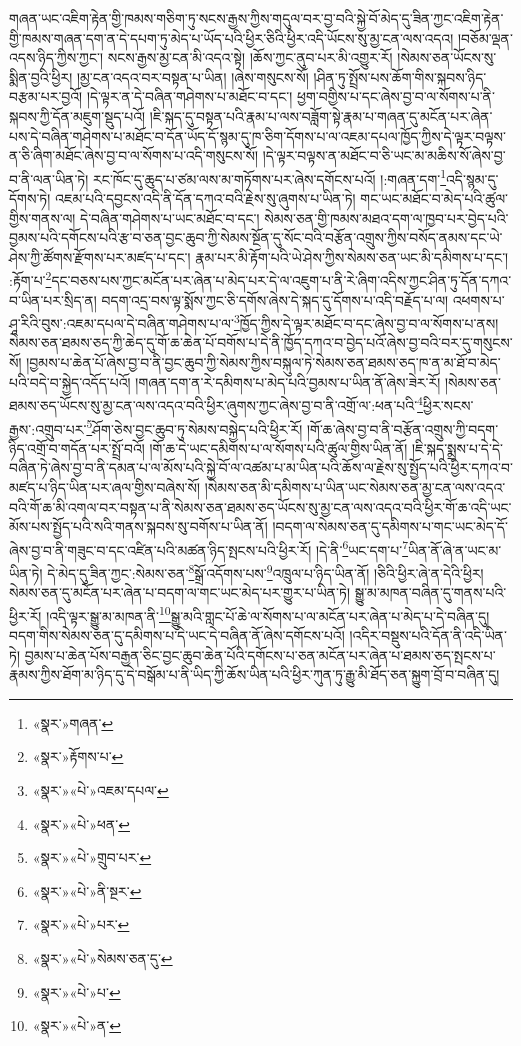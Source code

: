 གཞན་ཡང་འཇིག་རྟེན་གྱི་ཁམས་གཅིག་ཏུ་སངས་རྒྱས་ཀྱིས་གདུལ་བར་བྱ་བའི་སྐྱེ་བོ་མེད་དུ་ཟིན་ཀྱང་འཇིག་རྟེན་གྱི་ཁམས་གཞན་དག་ན་དེ་དཔག་ཏུ་མེད་པ་ཡོད་པའི་ཕྱིར་ཅིའི་ཕྱིར་འདི་ཡོངས་སུ་མྱ་ངན་ལས་འདའ། །བཅོམ་ལྡན་འདས་ཉིད་ཀྱིས་ཀྱང་། སངས་རྒྱས་མྱ་ངན་མི་འདའ་སྟེ། །ཆོས་ཀྱང་ནུབ་པར་མི་འགྱུར་རོ། །སེམས་ཅན་ཡོངས་སུ་སྨིན་བྱའི་ཕྱིར། །མྱ་ངན་འདའ་བར་བསྟན་པ་ཡིན། །ཞེས་གསུངས་སོ། །ཤིན་ཏུ་སྤྲོས་པས་ཆོག་གིས་སྐབས་ཉིད་བརྩམ་པར་བྱའོ། །དེ་ལྟར་ན་དེ་བཞིན་གཤེགས་པ་མཐོང་བ་དང་། ཕྱག་བགྱིས་པ་དང་ཞེས་བྱ་བ་ལ་སོགས་པ་ནི་སྐབས་ཀྱི་དོན་མཇུག་སྡུད་པའོ། །ཇི་སྐད་དུ་བསྟན་པའི་རྣམ་པ་ལས་བཟློག་སྟེ་རྣམ་པ་གཞན་དུ་མངོན་པར་ཞེན་པས་དེ་བཞིན་གཤེགས་པ་མཐོང་བ་དོན་ཡོད་དོ་སྙམ་དུ་ཁ་ཅིག་དོགས་པ་ལ་འཇམ་དཔལ་ཁྱོད་ཀྱིས་དེ་ལྟར་བལྟས་ན་ཅི་ཞིག་མཐོང་ཞེས་བྱ་བ་ལ་སོགས་པ་འདི་གསུངས་སོ། །དེ་ལྟར་བལྟས་ན་མཐོང་བ་ཅི་ཡང་མ་མཆིས་སོ་ཞེས་བྱ་བ་ནི་ལན་ཡིན་ཏེ། རང་ཁོང་དུ་ཆུད་པ་ཙམ་ལས་མ་གཏོགས་པར་ཞེས་དགོངས་པའོ། །:གཞན་དག་\footnote{«སྣར་»གཞན་}འདི་སྙམ་དུ་དོགས་ཏེ། འཇམ་པའི་དབྱངས་འདི་ནི་དོན་དཀའ་བའི་རྗེས་སུ་ཞུགས་པ་ཡིན་ཏེ། གང་ཡང་མཐོང་བ་མེད་པའི་ཚུལ་གྱིས་གནས་ལ། དེ་བཞིན་གཤེགས་པ་ཡང་མཐོང་བ་དང་། སེམས་ཅན་གྱི་ཁམས་མཐའ་དག་ལ་ཁྱབ་པར་བྱེད་པའི་བྱམས་པའི་དགོངས་པའི་རྩ་བ་ཅན་བྱང་ཆུབ་ཀྱི་སེམས་སྔོན་དུ་སོང་བའི་བརྩོན་འགྲུས་ཀྱིས་བསོད་ནམས་དང་ཡེ་ཤེས་ཀྱི་ཚོགས་རྫོགས་པར་མཛད་པ་དང་། རྣམ་པར་མི་རྟོག་པའི་ཡེ་ཤེས་ཀྱིས་སེམས་ཅན་ཡང་མི་དམིགས་པ་དང་། :རྟོག་པ་\footnote{«སྣར་»རྟོགས་པ་}དང་བཅས་པས་ཀྱང་མངོན་པར་ཞེན་པ་མེད་པར་དེ་ལ་འཇུག་པ་ནི་རེ་ཞིག་འདིས་ཀྱང་ཤིན་ཏུ་དོན་དཀའ་བ་ཡིན་པར་སྲིད་ན། བདག་འདྲ་བས་ལྟ་སྨོས་ཀྱང་ཅི་དགོས་ཞེས་དེ་སྐད་དུ་དོགས་པ་འདི་བརྗོད་པ་ལ། འཕགས་པ་ཤཱ་རིའི་བུས་:འཇམ་དཔལ་དེ་བཞིན་གཤེགས་པ་ལ་\footnote{«སྣར་»«པེ་»འཇམ་དཔལ་}ཁྱོད་ཀྱིས་དེ་ལྟར་མཐོང་བ་དང་ཞེས་བྱ་བ་ལ་སོགས་པ་ནས། སེམས་ཅན་ཐམས་ཅད་ཀྱི་ཆེད་དུ་གོ་ཆ་ཆེན་པོ་བགོས་པ་དེ་ནི་ཁྱོད་དཀའ་བ་བྱེད་པའོ་ཞེས་བྱ་བའི་བར་དུ་གསུངས་སོ། །བྱམས་པ་ཆེན་པོ་ཞེས་བྱ་བ་ནི་བྱང་ཆུབ་ཀྱི་སེམས་ཀྱིས་བསྐུལ་ཏེ་སེམས་ཅན་ཐམས་ཅད་ཁ་ན་མ་ཐོ་བ་མེད་པའི་བདེ་བ་སྐྱེད་འདོད་པའོ། །གཞན་དག་ན་རེ་དམིགས་པ་མེད་པའི་བྱམས་པ་ཡིན་ནོ་ཞེས་ཟེར་རོ། །སེམས་ཅན་ཐམས་ཅད་ཡོངས་སུ་མྱ་ངན་ལས་འདའ་བའི་ཕྱིར་ཞུགས་ཀྱང་ཞེས་བྱ་བ་ནི་འགྲོ་ལ་:ཕན་པའི་\footnote{«སྣར་»«པེ་»ཕན་}ཕྱིར་སངས་རྒྱས་:འགྲུབ་པར་\footnote{«སྣར་»«པེ་»གྲུབ་པར་}ཤོག་ཅེས་བྱང་ཆུབ་ཏུ་སེམས་བསྐྱེད་པའི་ཕྱིར་རོ། །གོ་ཆ་ཞེས་བྱ་བ་ནི་བརྩོན་འགྲུས་ཀྱི་བདག་ཉིད་འགྲོ་བ་གདོན་པར་སྤྲོ་བའོ། །གོ་ཆ་དེ་ཡང་དམིགས་པ་ལ་སོགས་པའི་ཚུལ་གྱིས་ཡིན་ནོ། །ཇི་སྐད་སྨྲས་པ་དེ་དེ་བཞིན་ཏེ་ཞེས་བྱ་བ་ནི་དམན་པ་ལ་མོས་པའི་སྐྱེ་བོ་ལ་འཚམ་པ་མ་ཡིན་པའི་ཆོས་ལ་རྗེས་སུ་སྤྱོད་པའི་ཕྱིར་དཀའ་བ་མཛད་པ་ཉིད་ཡིན་པར་ཞལ་གྱིས་བཞེས་སོ། །སེམས་ཅན་མི་དམིགས་པ་ཡིན་ཡང་སེམས་ཅན་མྱ་ངན་ལས་འདའ་བའི་གོ་ཆ་མི་འགལ་བར་བསྟན་པ་ནི་སེམས་ཅན་ཐམས་ཅད་ཡོངས་སུ་མྱ་ངན་ལས་འདའ་བའི་ཕྱིར་གོ་ཆ་འདི་ཡང་མོས་པས་སྤྱོད་པའི་སའི་གནས་སྐབས་སུ་བགོས་པ་ཡིན་ནོ། །བདག་ལ་སེམས་ཅན་དུ་དམིགས་པ་གང་ཡང་མེད་དོ་ཞེས་བྱ་བ་ནི་གཟུང་བ་དང་འཛིན་པའི་མཚན་ཉིད་སྤངས་པའི་ཕྱིར་རོ། །དེ་ནི་\footnote{«སྣར་»«པེ་»ནི་སྔར་}ཡང་དག་པ་\footnote{«སྣར་»«པེ་»པར་}ཡིན་ནོ་ཞེ་ན་ཡང་མ་ཡིན་ཏེ། དེ་མེད་དུ་ཟིན་ཀྱང་:སེམས་ཅན་\footnote{«སྣར་»«པེ་»སེམས་ཅན་དུ་}སྒྲོ་འདོགས་པས་\footnote{«སྣར་»«པེ་»པ་}འཁྲུལ་པ་ཉིད་ཡིན་ནོ། །ཅིའི་ཕྱིར་ཞེ་ན་དེའི་ཕྱིར། སེམས་ཅན་དུ་མངོན་པར་ཞེན་པ་བདག་ལ་གང་ཡང་མེད་པར་གྱུར་པ་ཡིན་ཏེ། སྒྱུ་མ་མཁན་བཞིན་དུ་གནས་པའི་ཕྱིར་རོ། །འདི་ལྟར་སྒྱུ་མ་མཁན་ནི་\footnote{«སྣར་»«པེ་»ན་}སྒྱུ་མའི་གླང་པོ་ཆེ་ལ་སོགས་པ་ལ་མངོན་པར་ཞེན་པ་མེད་པ་དེ་བཞིན་དུ། བདག་གིས་སེམས་ཅན་དུ་དམིགས་པ་དེ་ཡང་དེ་བཞིན་ནོ་ཞེས་དགོངས་པའོ། །འདིར་བསྡུས་པའི་དོན་ནི་འདི་ཡིན་ཏེ། བྱམས་པ་ཆེན་པོས་བརྒྱན་ཅིང་བྱང་ཆུབ་ཆེན་པོའི་དགོངས་པ་ཅན་མངོན་པར་ཞེན་པ་ཐམས་ཅད་སྤངས་པ་རྣམས་ཀྱིས་ཐོག་མ་ཉིད་དུ་དེ་བསྒོམ་པ་ནི་ཡིད་ཀྱི་ཆོས་ཡིན་པའི་ཕྱིར་ཀུན་ཏུ་རྒྱུ་མི་ཐོད་ཅན་སྐྱུག་བྲོ་བ་བཞིན་དུ། 